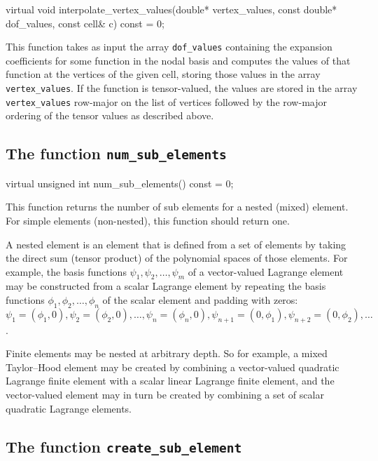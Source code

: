 \begin{code}
virtual void
interpolate_vertex_values(double* vertex_values,
                          const double* dof_values,
                          const cell& c) const = 0;
\end{code}

This function takes as input the array \texttt{dof\_values} containing
the expansion coefficients for some function in the nodal basis and
computes the values of that function at the vertices of the given
cell, storing those values in the array \texttt{vertex\_values}. If
the function is tensor-valued, the values are stored in the array
\texttt{vertex\_values} row-major on the list of vertices followed by the
row-major ordering of the tensor values as described above.

\subsection{The function \texttt{num\_sub\_elements}}

\begin{code}
virtual unsigned int num_sub_elements() const = 0;
\end{code}

This function returns the number of sub elements for a nested (mixed)
element. For simple elements (non-nested), this function should return
one.

A nested element is an element that is defined from a set of elements
by taking the direct sum (tensor product) of the polynomial spaces of
those elements. For example, the basis functions $\psi_1, \psi_2,
\ldots, \psi_m$ of a vector-valued Lagrange element may be constructed
from a scalar Lagrange element by repeating the basis functions
$\phi_1, \phi_2, \ldots, \phi_n$ of the scalar element and padding
with zeros: $\psi_1 = (\phi_1, 0), \psi_2 = (\phi_2, 0), \ldots,
\psi_n = (\phi_n, 0), \psi_{n+1} = (0, \phi_1), \psi_{n+2} = (0,
\phi_2), \ldots$.

Finite elements may be nested at arbitrary depth. So for example, a
mixed Taylor--Hood element may be created by combining a vector-valued
quadratic Lagrange finite element with a scalar linear Lagrange finite
element, and the vector-valued element may in turn be created by
combining a set of scalar quadratic Lagrange elements.

\subsection{The function \texttt{create\_sub\_element}}

